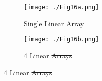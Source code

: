 \documentclass[preprint,authoryear,12pt]{elsarticle}
\providecommand{\DIFaddtex}[1]{{\protect\color{blue}\uwave{#1}}} %
\providecommand{\DIFdeltex}[1]{{\protect\color{red}\sout{#1}}}                      %
\providecommand{\DIFaddFL}[1]{\DIFadd{#1}} %
\providecommand{\DIFdelFL}[1]{\DIFdel{#1}} %
\providecommand{\DIFaddbeginFL}{} %
\providecommand{\DIFaddendFL}{} %
\providecommand{\DIFdelbeginFL}{} %
\providecommand{\DIFdelendFL}{} %
\providecommand{\DIFadd}[1]{\texorpdfstring{\DIFaddtex{#1}}{#1}} %
\providecommand{\DIFdel}[1]{\texorpdfstring{\DIFdeltex{#1}}{}} %
\begin{document}
\begin{figure}[htp]{}
   \begin{center}
      \begin{subfigure}{0.48\linewidth}
         \label{fig:SynthMosaic_Horseshoe_SingleLinear_South}
         \DIFdelbeginFL %
\DIFdelendFL \DIFaddbeginFL \texttt{[image: ./Fig16a.png]}
         \DIFaddendFL \caption{Single Linear Array}
      \end{subfigure}
      \hspace{-0.7cm}
      \qquad
      \begin{subfigure}{0.48\linewidth}
         \label{fig:SynthMosaic_Horseshoe_4Linear_South}
         \DIFdelbeginFL %
\DIFdelendFL \DIFaddbeginFL \texttt{[image: ./Fig16b.png]}
         \DIFaddendFL \caption{4 Linear \DIFdelbeginFL \DIFdelFL{Arrays}\DIFdelendFL \DIFaddbeginFL \DIFaddFL{Array}\DIFaddendFL }
      \end{subfigure}
      \vspace{0.2cm}


\end{center}
\end{figure}
\end{document}
